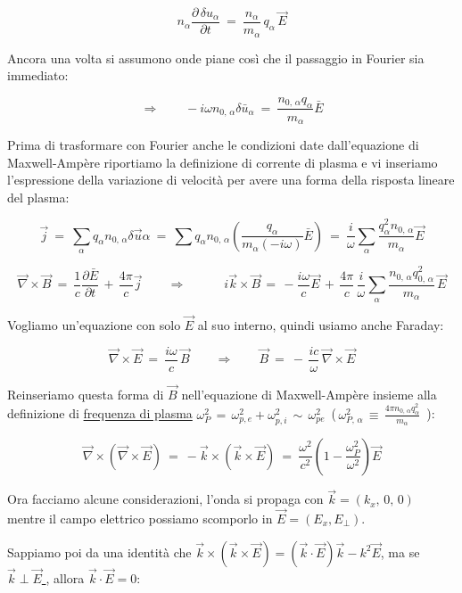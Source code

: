 \[ n_\alpha \frac{\partial\, \delta u_\alpha}{\partial t}\ =\ \frac{n_\alpha}{m_\alpha}\, q_\alpha\, \vec E\]

Ancora una volta si assumono onde piane così che il passaggio in Fourier sia immediato:

\[\Rightarrow\quad \quad -i\omega n_{0,\,\alpha} \delta\bar u_\alpha\ =\ \frac{n_{0,\, \alpha}q_\alpha}{m_\alpha}\bar E \]

Prima di trasformare con Fourier anche le condizioni date dall'equazione di Maxwell-Ampère riportiamo la definizione di corrente di plasma e vi inseriamo l'espressione della variazione di velocità per avere una forma della risposta lineare del plasma:

\[ \vec j\ =\ \sum_\alpha q_\alpha n_{0,\,\alpha}\delta \vec u\alpha\ =\ \sum  q_\alpha n_{0,\,\alpha}\left( \frac{q_\alpha}{m_\alpha (-i\omega)}\bar E\right)\ =\ \frac{i}{\omega}\sum_\alpha \frac{ q^2_\alpha n_{0,\,\alpha}}{m_\alpha} \vec E \]

\[\vec\nabla\times\vec B\ =\ \frac{1}{c}\frac{\partial \bar E}{\partial t} \,+\, \frac{4\pi}{c}\vec j\quad \quad\Rightarrow \quad\quad \quad i\vec k \times \vec B\, =\, -\frac{i\omega}{c}\vec E\, +\,\frac{4\pi}{c}\,\frac{i}{\omega}\sum_\alpha \frac{n_{0,\,\alpha} q_{0,\,\alpha}^2}{m_\alpha}\, \vec E\]

Vogliamo un'equazione con solo $\vec E$ al suo interno, quindi usiamo anche Faraday:

\[ \vec\nabla\times\vec E\ =\ \frac{i\omega}{c}\, \vec B\quad \quad \Rightarrow 
\quad \quad 
\vec B\ =\ -\,\frac{i c}{\omega}\,\vec \nabla\times \vec E \]

Reinseriamo questa forma di $\vec B$ nell'equazione di Maxwell-Ampère insieme alla definizione di \underline{frequenza di plasma} $\omega_P^2\, =\,\omega^2_{p,e}+\omega^2_{p,i}\,\sim\, \omega^2_{pe}$\  (\,$\omega^2_{P,\,\alpha}\, \equiv\, \frac{4\pi n_{0,\, \alpha} q^2_\alpha}{m_\alpha}$\ ):

\[\vec\nabla\times (\vec\nabla \times\vec E)\ =\ -\vec k\times (\vec k\times \vec E)\ =\ \frac{\omega^2}{c^2} \left(1-\frac{\omega^2_P}{\omega^2} \right) \vec E\]

Ora facciamo alcune considerazioni, l'onda si propaga con $\vec k = (k_x,\, 0,\, 0)$ mentre il campo elettrico possiamo scomporlo in $\vec E = ( E_x, E_\perp)$. 

Sappiamo poi da una identità che $\vec k\times(\vec k\times \vec E) = (\vec k\cdot \vec E)\vec k - k^2\vec E$, ma se \underline{ $\vec k\perp \vec E$ } , allora $\vec k\cdot \vec E = 0$:

